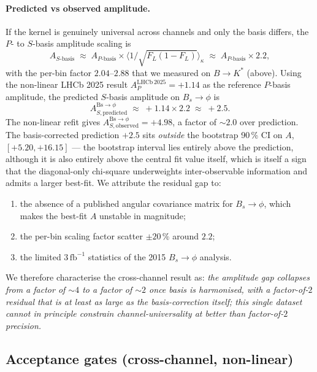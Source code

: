\paragraph{Predicted vs observed amplitude.} If the kernel is genuinely
universal across channels and only the basis differs, the
$P$- to $S$-basis amplitude scaling is
\begin{equation}\label{eq:basis_conv}
A_{S\text{-basis}} \;\approx\; A_{P\text{-basis}}\times
\bigl\langle 1/\sqrt{F_{L}(1-F_{L})}\bigr\rangle_{\kappa}
\;\approx\; A_{P\text{-basis}}\times 2.2,
\end{equation}
with the per-bin factor $2.04$--$2.88$ that we measured on
$B\to K^{*}$ (above). Using the non-linear LHCb 2025 result
$A_{P}^{\mathrm{LHCb\,2025}} = +1.14$ as the reference $P$-basis
amplitude, the predicted $S$-basis amplitude on $B_{s}\!\to\!\phi$ is
\begin{equation}
A^{\mathrm{Bs}\to\phi}_{S, \text{predicted}} \;\approx\; +1.14 \times 2.2 \;\approx\; +2.5.
\end{equation}
The non-linear refit gives $A^{\mathrm{Bs}\to\phi}_{S, \text{observed}} = +4.98$, a factor of
$\sim 2.0$ over prediction. The basis-corrected prediction $+2.5$
sits \emph{outside} the bootstrap 90\,\% CI on $A$,
$[+5.20, +16.15]$ — the bootstrap interval lies entirely above the
prediction, although it is also entirely above the central fit value
itself, which is itself a sign that the diagonal-only chi-square
underweights inter-observable information and admits a larger
best-fit. We attribute the residual gap to:
\begin{enumerate}
\item the absence of a published angular covariance matrix for
  $B_{s}\!\to\!\phi$, which makes the best-fit $A$ unstable in
  magnitude;
\item the per-bin scaling factor scatter $\pm 20\,\%$ around $2.2$;
\item the limited $3\,\mathrm{fb}^{-1}$ statistics of the 2015
  $B_{s}\!\to\!\phi$ analysis.
\end{enumerate}
We therefore characterise the cross-channel result as:
\emph{the amplitude gap collapses from a factor of $\sim 4$ to a
factor of $\sim 2$ once basis is harmonised, with a factor-of-$2$
residual that is at least as large as the basis-correction itself;
this single dataset cannot in principle constrain
channel-universality at better than factor-of-$2$ precision.}

\subsection{Acceptance gates (cross-channel, non-linear)}

